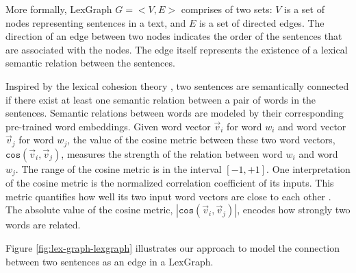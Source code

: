 More formally, LexGraph $G=<V,E>$ comprises of two sets: $V$ is a set of nodes representing sentences in a text, and $E$ is a set of directed edges. 
The direction of an edge between two nodes indicates the order of the sentences that are associated with the nodes. 
The edge itself represents the existence of a lexical semantic relation between the sentences. 

Inspired by the lexical cohesion theory \cite{halliday76}, two sentences are semantically connected if there exist at least one semantic relation between a pair of words in the sentences. 
Semantic relations between words are modeled by their corresponding pre-trained word embeddings.  
Given word vector $\vec{v}_i$ for word $w_i$ and word vector $\vec{v}_j$ for word $w_j$, the value of the cosine metric between these two word vectors, $\mathtt{cos}(\vec{v}_i,\vec{v}_j)$, measures the strength of the relation between word $w_i$ and word $w_j$. 
The range of the cosine metric is in the interval $\left[ -1, +1 \right]$.  
One interpretation of the cosine metric is the normalized correlation coefficient of its inputs.
This metric quantifies how well its two input word vectors are  close to each other \cite{manning99}. 
The absolute value of the cosine metric, $|\mathtt{cos}(\vec{v}_i,\vec{v}_j)|$, encodes how strongly two words are related.  

Figure \ref{fig:lex-graph-lexgraph} illustrates our approach to model the connection between two sentences as an edge in a LexGraph. 

